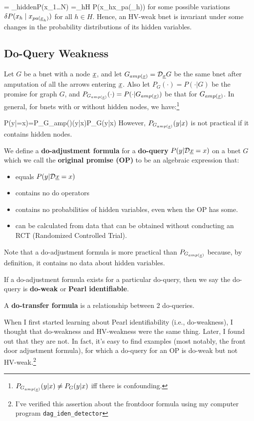 = \delta_{hidden}P(x_{1\dots N})
=\sum_{h\in H}
\delta
P(x_h\mid x_{pa(\rvx_h)})
\eeq  
for some possible 
variations
$\delta P(x_h\mid x_{pa(\rvx_h)})$
for all $h\in H$.
Hence, an HV-weak bnet
is invariant under some changes
in the probability
distributions of its hidden variables. 
\subsection{Do-Query Weakness}

Let $G$ be a bnet
with a node $\rvx$,
and let $G_{amp(\rvx)}=\cald_{\rvx}G$
be the same bnet after amputation of all the 
arrows entering
$\rvx$.
Also let $P_G(\cdot)=P(\cdot|G)$ be
the promise
for graph $G$, and $P_{G_{amp(\rvx)}}(\cdot)=
P(\cdot|G_{amp(\rvx)})$
be that for $G_{amp(\rvx)}$.
In general, 
for bnets
with or  without hidden nodes, we have:\footnote{
$P_{G_{amp(\rvx)}}(y|x)\neq P_G(y|x)$
iff there is confounding.
}

\beq
P(y|\cald\rvx=x)=P_{G_{amp(\rvx)}}(y|x)\neq P_G(y|x)
\;
\eeq
However, $P_{G_{amp(\rvx)}}(y|x)$ is
not practical if
it contains hidden nodes. 

We define a {\bf do-adjustment formula}
for a {\bf do-query}
$P(y|\cald\rvx=x)$
on a bnet $G$
which we call
the {\bf original promise (OP)}
to be an algebraic expression that:
\begin{itemize}
\item equals 
$P(y|\cald \rvx=x)$
\item contains no do operators
\item contains no probabilities of hidden variables, even when the OP has some.
\item can be calculated from data that can be obtained without 
conducting an RCT (Randomized Controlled Trial).

\end{itemize} 

Note that a do-adjustment
formula is more practical
than $P_{G_{amp(\rvx)}}$
because, by definition,  it
contains no data
about hidden variables.



If a do-adjustment formula
exists for a
particular do-query,
then we say the do-query is
 {\bf do-weak} or {\bf Pearl identifiable}.

A {\bf do-transfer formula}
is a relationship between 2  do-queries.

When I first
started learning 
about Pearl identifiability (i.e., do-weakness),
I thought that do-weakness and
HV-weakness
were the same thing.
Later, I found out
that they are not.
In fact, it's easy to 
find examples (most notably, the front door adjustment formula), for which
a do-query for an
OP is do-weak but not
HV-weak.\footnote{I've verified this assertion
about the frontdoor formula using  my computer program
{\tt dag\_iden\_detector}}



